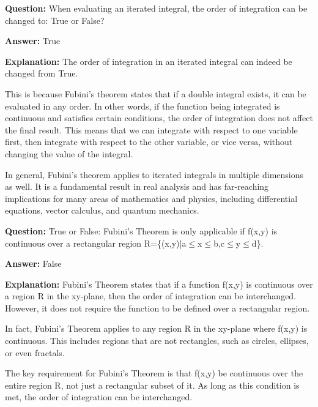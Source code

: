 \documentclass{article}
\begin{document}
                \vspace{0.5cm} 
        
            
                \textbf {Question:} When evaluating an iterated integral, the order of integration can be changed to: True or False?
                
                \textbf{Answer:} True

                \textbf{Explanation:} The order of integration in an iterated integral can indeed be changed from True.

This is because Fubini's theorem states that if a double integral exists, it can be evaluated in any order. In other words, if the function being integrated is continuous and satisfies certain conditions, the order of integration does not affect the final result. This means that we can integrate with respect to one variable first, then integrate with respect to the other variable, or vice versa, without changing the value of the integral.

In general, Fubini's theorem applies to iterated integrals in multiple dimensions as well. It is a fundamental result in real analysis and has far-reaching implications for many areas of mathematics and physics, including differential equations, vector calculus, and quantum mechanics.
                
                \vspace{0.5cm} 
        
            
                \textbf {Question:} True or False: Fubini's Theorem is only applicable if f(x,y) is continuous over a rectangular region R=\{(x,y)|a\ensuremath{\leq}x\ensuremath{\leq}b,c\ensuremath{\leq}y\ensuremath{\leq}d\}.
                
                \textbf{Answer:} False

                \textbf{Explanation:} Fubini's Theorem states that if a function f(x,y) is continuous over a region R in the xy-plane, then the order of integration can be interchanged. However, it does not require the function to be defined over a rectangular region.

In fact, Fubini's Theorem applies to any region R in the xy-plane where f(x,y) is continuous. This includes regions that are not rectangles, such as circles, ellipses, or even fractals.

The key requirement for Fubini's Theorem is that f(x,y) be continuous over the entire region R, not just a rectangular subset of it. As long as this condition is met, the order of integration can be interchanged.
                
\end{document}
